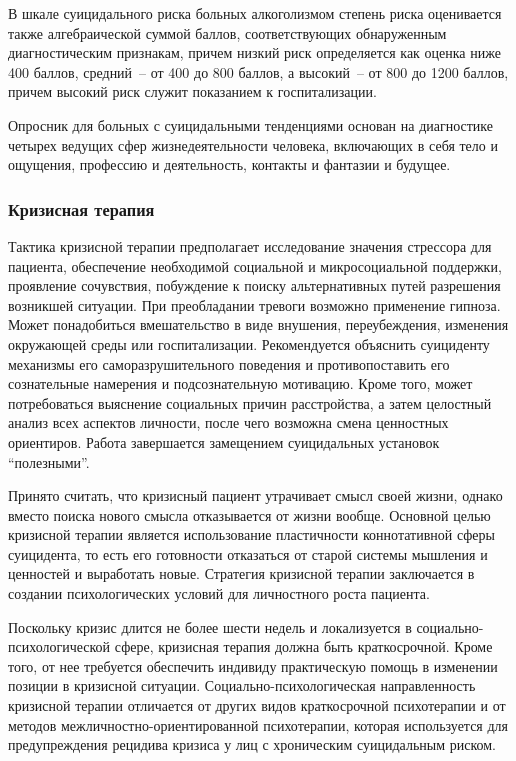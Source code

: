 В шкале суицидального риска больных алкоголизмом степень риска оценивается также алгебраической суммой баллов, соответствующих обнаруженным диагностическим признакам, причем низкий риск определяется как оценка ниже 400 баллов, средний~-- от 400 до 800 баллов, а высокий~-- от 800 до 1200 баллов, причем высокий риск служит показанием к госпитализации.~\cite{starsen}

Опросник для больных с суицидальными тенденциями основан на диагностике четырех ведущих сфер жизнедеятельности человека, включающих в себя тело и ощущения, профессию и деятельность, контакты и фантазии и будущее.~\cite{starsen}

\subsubsection{Кризисная терапия}

Тактика кризисной терапии предполагает исследование значения стрессора для пациента, обеспечение необходимой социальной и микросоциальной поддержки, проявление сочувствия, побуждение к поиску альтернативных путей разрешения возникшей ситуации. При преобладании тревоги возможно применение гипноза. Может понадобиться вмешательство в виде внушения, переубеждения, изменения окружающей среды или госпитализации. Рекомендуется объяснить суициденту механизмы его саморазрушительного поведения и противопоставить его сознательные намерения и подсознательную мотивацию. Кроме того, может потребоваться выяснение социальных причин расстройства, а затем целостный анализ всех аспектов личности, после чего возможна смена ценностных ориентиров. Работа завершается замещением суицидальных установок ``полезными''.~\cite{starsen}

Принято считать, что кризисный пациент утрачивает смысл своей жизни, однако вместо поиска нового смысла отказывается от жизни вообще. Основной целью кризисной терапии является использование пластичности коннотативной сферы суицидента, то есть его готовности отказаться от старой системы мышления и ценностей и выработать новые. Стратегия кризисной терапии заключается в создании психологических условий для личностного роста пациента.~\cite{starsen}

Поскольку кризис длится не более шести недель и локализуется в социально-психологической сфере, кризисная терапия должна быть краткосрочной. Кроме того, от нее требуется обеспечить индивиду практическую помощь в изменении позиции в кризисной ситуации. Социально-психологическая направленность кризисной терапии отличается от других видов краткосрочной психотерапии и от методов межличностно-ориентированной психотерапии, которая используется для предупреждения рецидива кризиса у лиц с хроническим суицидальным риском.~\cite{starsen}

